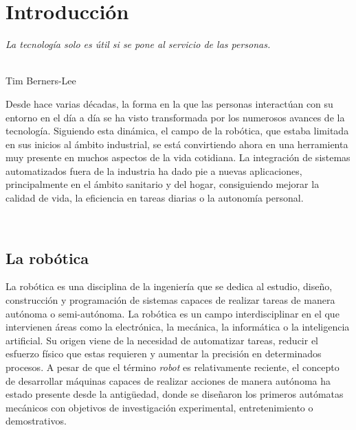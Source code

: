 \chapter{Introducción}
\label{cap:capitulo1}
\setcounter{page}{1}

\begin{flushright}
\begin{minipage}[]{7cm}
\emph{La tecnología solo es útil si se pone al servicio de las personas.}\\
\end{minipage}\\

Tim Berners-Lee\\
\end{flushright}

\vspace{0.5cm}

Desde hace varias décadas, la forma en la que las personas interactúan con su entorno en el día a día se ha visto transformada por los numerosos avances de la tecnología. Siguiendo esta dinámica, el campo de la robótica, que estaba limitada en sus inicios al ámbito industrial, se está convirtiendo ahora en una herramienta muy presente en muchos aspectos de la vida cotidiana. La integración de sistemas automatizados fuera de la industria ha dado pie a nuevas aplicaciones, principalmente en el ámbito sanitario y del hogar, consiguiendo mejorar la calidad de vida, la eficiencia en tareas diarias o la autonomía personal.

\

\section{La robótica}
\label{sec:miseccion} %

La robótica es una disciplina de la ingeniería que se dedica al estudio, diseño, construcción y programación de sistemas capaces de realizar tareas de manera autónoma o semi-autónoma. La robótica es un campo interdisciplinar en el que intervienen áreas como la electrónica, la mecánica, la informática o la inteligencia artificial. Su origen viene de la necesidad de automatizar tareas, reducir el esfuerzo físico que estas requieren y aumentar la precisión en determinados procesos. A pesar de que el término \textit{robot} es relativamente reciente, el concepto de desarrollar máquinas capaces de realizar acciones de manera autónoma ha estado presente desde la antigüedad, donde se diseñaron los primeros autómatas mecánicos con objetivos de investigación experimental, entretenimiento o demostrativos.\\

